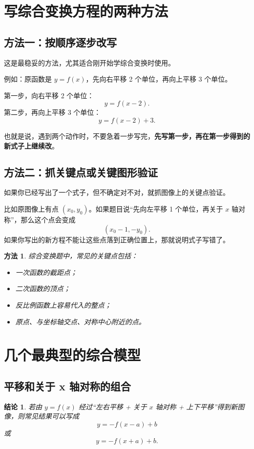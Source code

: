 \documentclass[11pt,a4paper,fontset=fandol]{ctexart}
\theoremstyle{formaltheorem}
\newtheorem{theorem}{结论}[section]
\newtheorem{method}{方法}[section]
\theoremstyle{formalexample}
\begin{document}
\section{写综合变换方程的两种方法}

\subsection{方法一：按顺序逐步改写}
这是最稳妥的方法，尤其适合刚开始学综合变换时使用。

例如：原函数是 \(y=f(x)\)，先向右平移 2 个单位，再向上平移 3 个单位。

第一步，向右平移 2 个单位：
\[
y=f(x-2).
\]
第二步，再向上平移 3 个单位：
\[
y=f(x-2)+3.
\]

也就是说，遇到两个动作时，不要急着一步写完，\textbf{先写第一步，再在第一步得到的新式子上继续改}。

\subsection{方法二：抓关键点或关键图形验证}
如果你已经写出了一个式子，但不确定对不对，就抓图像上的关键点验证。

比如原图像上有点 \((x_0,y_0)\)。如果题目说“先向左平移 1 个单位，再关于 \(x\) 轴对称”，那么这个点会变成
\[
(x_0-1,-y_0).
\]
如果你写出的新方程不能让这些点落到正确位置上，那就说明式子写错了。

\begin{method}
综合变换题中，常见的关键点包括：
\begin{itemize}
  \item 一次函数的截距点；
  \item 二次函数的顶点；
  \item 反比例函数上容易代入的整点；
  \item 原点、与坐标轴交点、对称中心附近的点。
\end{itemize}
\end{method}

\section{几个最典型的综合模型}

\subsection{平移和关于 x 轴对称的组合}
\begin{theorem}
若由 \(y=f(x)\) 经过“左右平移 + 关于 \(x\) 轴对称 + 上下平移”得到新图像，则常见结果可以写成
\[
y=-f(x-a)+b
\]
或
\[
y=-f(x+a)+b.
\]
\end{theorem}
\end{document}
